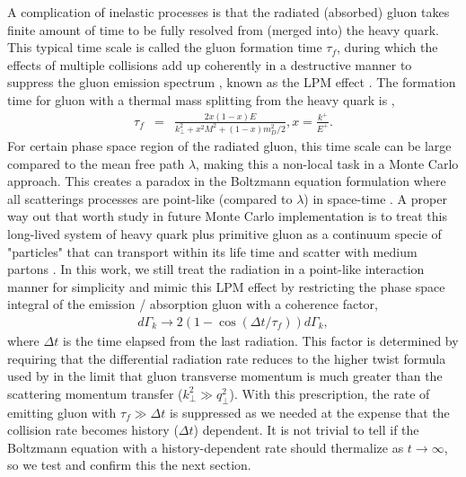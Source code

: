 \documentclass[aps, prc, reprint, amsmath, groupedaddress, nofootinbib]{revtex4-1}
\begin{document}
A complication of inelastic processes is that the radiated (absorbed) gluon takes finite amount of time to be fully resolved from (merged into) the heavy quark.
This typical time scale is called the gluon formation time $\tau_f$, during which the effects of multiple collisions add up coherently in a destructive manner to suppress the gluon emission spectrum \cite{Wang:1994fx, Baier:1996kr, Zakharov:1996fv}, known as the LPM effect \cite{PhysRev.103.1811}.
The formation time for gluon with a thermal mass splitting from the heavy quark is \cite{Cao:2013ita},
\begin{eqnarray}
\tau_f &=& \frac{2x(1-x)E}{k_\perp^2 + x^2M^2 + (1-x)m_D^2/2}, x = \frac{k^+}{E^+}.
\end{eqnarray}
For certain phase space region of the radiated gluon, this time scale can be large compared to the mean free path $\lambda$, making this a non-local task in a Monte Carlo approach.
This creates a paradox in the Boltzmann equation formulation where all scatterings processes are point-like (compared to $\lambda$) in space-time  .
A proper way out that worth study in future Monte Carlo implementation is to treat this long-lived system of heavy quark plus primitive gluon as a continuum specie of "particles" that can transport within its life time and scatter with medium partons \cite{ColemanSmith:2012vr}.
In this work, we still treat the radiation in a point-like interaction manner for simplicity and mimic this LPM effect by restricting the phase space integral of the emission / absorption gluon with a coherence factor,
\begin{eqnarray}
d\Gamma_k \rightarrow 2\left(1 - \cos\left(\Delta t/\tau_f\right) \right)d\Gamma_k,
\end{eqnarray}
where $\Delta t$ is the time elapsed from the last radiation.
This factor is determined by requiring that the differential radiation rate reduces to the higher twist formula used by \cite{Cao:2013ita} in the limit that gluon transverse momentum is much greater than the scattering momentum transfer ($k_\perp^2 \gg q_\perp^2$).
With this prescription, the rate of emitting gluon with $\tau_f \gg \Delta t$ is suppressed as we needed at the expense that the collision rate becomes history ($\Delta t$) dependent.
It is not trivial to tell if the Boltzmann equation with a history-dependent rate should thermalize as $t\rightarrow \infty$, so we test and confirm this the next section.
\end{document}
